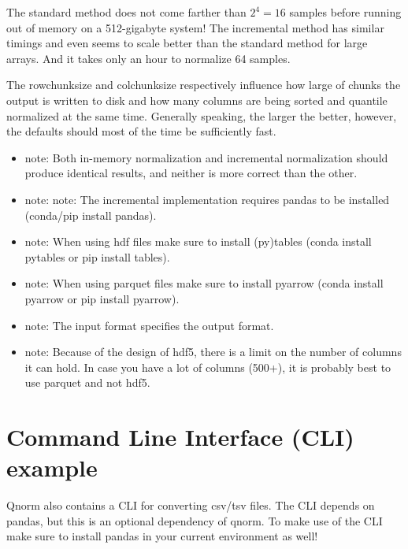 The standard method does not come farther than $2^4=16$ samples before running out of memory on a 512-gigabyte system! The incremental method has similar timings and even seems to scale better than the standard method for large arrays. And it takes only an hour to normalize 64 samples.

The rowchunksize and colchunksize respectively influence how large of chunks the output is written to disk and how many columns are being sorted and quantile normalized at the same time. Generally speaking, the larger the better, however, the defaults should most of the time be sufficiently fast.

\begin{itemize}
    \item note: Both in-memory normalization and incremental normalization should produce identical results, and neither is more correct than the other.

    \item note: note: The incremental implementation requires pandas to be installed (conda/pip install pandas).

    \item note: When using hdf files make sure to install (py)tables (conda install pytables or pip install tables).

    \item note: When using parquet files make sure to install pyarrow (conda install pyarrow or pip install pyarrow).

    \item note: The input format specifies the output format.

    \item note: Because of the design of hdf5, there is a limit on the number of columns it can hold. In case you have a lot of columns (500+), it is probably best to use parquet and not hdf5.

\end{itemize}

\section{Command Line Interface (CLI) example}

Qnorm also contains a CLI for converting csv/tsv files. The CLI depends on pandas, but this is an optional dependency of qnorm. To make use of the CLI make sure to install pandas in your current environment as well!

